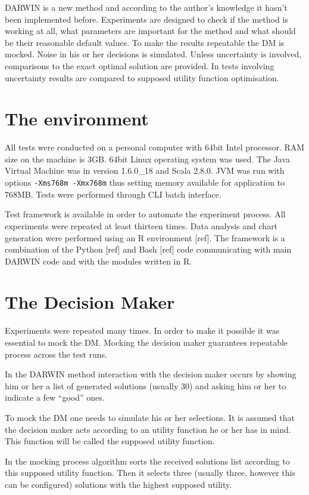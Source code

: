 DARWIN is a new method and according to the author's knowledge it hasn't been
implemented before. Experiments are designed to check if the method is working
at all, what parameters are important for the method and what should be their
reasonable default values. To make the results repeatable the DM is
mocked. Noise in his or her decisions is simulated. Unless uncertainty is
involved, comparisons to the exact optimal solution are provided. In tests
involving uncertainty results are compared to supposed utility function
optimisation.

\section{The environment}

All tests were conducted on a personal computer with 64bit Intel
processor. RAM size on the machine is 3GB. 64bit Linux operating system was
used. The Java Virtual Machine was in version 1.6.0\_18 and Scala 2.8.0. JVM
was run with options \texttt{-Xms768m -Xmx768m} thus setting memory available
for application to 768MB. Tests were performed through CLI batch interface.

Test framework is available in order to automate the experiment process. All
experiments were repeated at least thirteen times. Data analysis and chart
generation were performed using an R environment [ref]. The framework is a
combination of the Python [ref] and Bash [ref] code communicating with main
DARWIN code and with the modules written in R.

\section{The Decision Maker}

Experiments were repeated many times. In order to make it possible it was
essential to mock the DM. Mocking the decision maker guarantees repeatable
process across the test runs.

In the DARWIN method interaction with the decision maker occurs by showing him
or her a list of generated solutions (usually 30) and asking him or her to
indicate a few ``good'' ones.

To mock the DM one needs to simulate his or her selections. It is assumed that
the decision maker acts according to an utility function he or her has in
mind. This function will be called the supposed utility function.

In the mocking process algorithm sorts the received solutions list according
to this supposed utility function. Then it selects three (usually three,
however this can be configured) solutions with the highest supposed utility.

